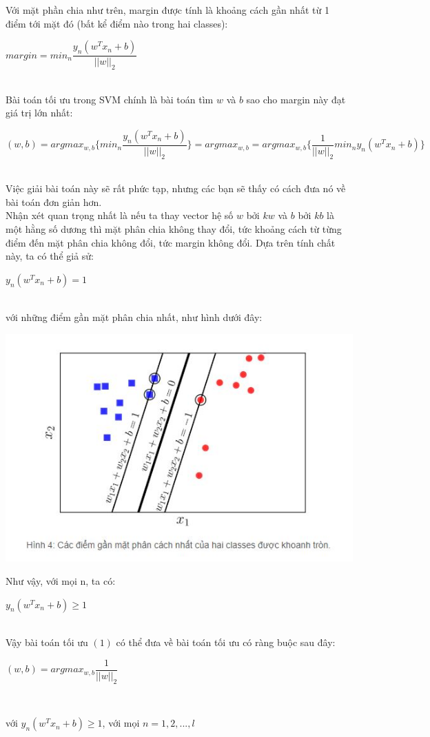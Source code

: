 \documentclass[12pt,a4paper]{article}
\begin{document}
Với mặt phần chia như trên, margin được tính là khoảng cách gần nhất từ 1 điểm tới mặt đó (bất kể điểm nào trong hai classes):\\
\centerline{$margin = min_{n}\dfrac{y_n(w^Tx_n+b)}{||w||_2}$}\\
\indent Bài toán tối ưu trong SVM chính là bài toán tìm $w$ và $b$ sao cho margin này đạt giá trị lớn nhất:\\
\centerline{$(w,b) = argmax_{w,b}\{min_n\dfrac{y_n(w^Tx_n+b)}{||w||_2}\} = argmax_{w,b} = argmax_{w,b}\{\dfrac{1}{||w||_2}min_n y_n(w^Tx_n+b)\}$}\\
\indent Việc giải bài toán này sẽ rất phức tạp, nhưng các bạn sẽ thấy có cách đưa nó về bài toán đơn giản hơn.\\
\indent Nhận xét quan trọng nhất là nếu ta thay vector hệ số $w$ bởi $kw$ và $b$ bởi $kb$ là một hằng số dương thì mặt phân chia không thay đổi, tức khoảng cách từ từng điểm đến mặt phân chia không đổi, tức margin không đổi. Dựa trên tính chất này, ta có thể giả sử:\\
\centerline{$y_n(w^Tx_n+b)=1$}\\
với những điểm gần mặt phân chia nhất, như hình dưới đây:
\begin{center}
    \includegraphics[scale=1]{img/img4}
\end{center}
Như vậy, với mọi n, ta có:\\
\centerline{$y_n(w^Tx_n+b) \geq 1$}\\
Vậy bài toán tối ưu $(1)$ có thể đưa về bài toán tối ưu có ràng buộc sau đây:\\
\centerline{$(w,b) = argmax_{w,b}\dfrac{1}{||w||_2}$}\\
\centerline{với $y_n(w^Tx_n+b) \geq 1$, với mọi $n=1,2,...,l$}\\
\end{document}
